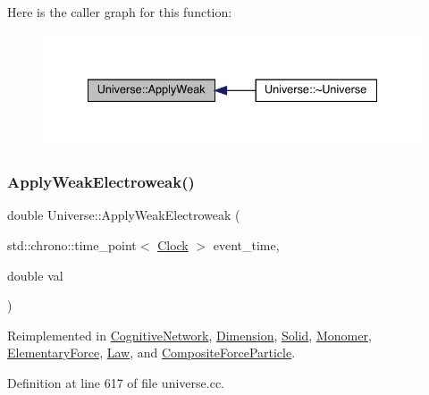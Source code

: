 Here is the caller graph for this function\+:
\nopagebreak
\begin{figure}[H]
\begin{center}
\leavevmode
\includegraphics[width=335pt]{class_universe_a6d1226b3adec3c42a833afdbb6a65a92_icgraph}
\end{center}
\end{figure}
\mbox{\label{class_universe_a46a906baabb63e5d31f8b48ea1fae52e}} 
\subsubsection{\texorpdfstring{Apply\+Weak\+Electroweak()}{ApplyWeakElectroweak()}}
{\footnotesize\ttfamily double Universe\+::\+Apply\+Weak\+Electroweak (\begin{DoxyParamCaption}\item[{std\+::chrono\+::time\+\_\+point$<$ \hyperlink{universe_8h_a0ef8d951d1ca5ab3cfaf7ab4c7a6fd80}{Clock} $>$}]{event\+\_\+time,  }\item[{double}]{val }\end{DoxyParamCaption})\hspace{0.3cm}{\ttfamily [virtual]}}



Reimplemented in \hyperlink{class_cognitive_network_ab8bc213d2806f0dc49c1284bf934fc24}{Cognitive\+Network}, \hyperlink{class_dimension_abf490cabd486afa660f17940ed0d17e6}{Dimension}, \hyperlink{class_solid_ad6c28ec896cbcf64e24a7132a144befd}{Solid}, \hyperlink{class_monomer_a64f65c128ebc2428c42739c930696ea1}{Monomer}, \hyperlink{class_elementary_force_a2d3a5444c771f35d66d4151c62f53b12}{Elementary\+Force}, \hyperlink{class_law_ae8a5d1d09686d79f7814c8800791460b}{Law}, and \hyperlink{class_composite_force_particle_a3c1c0b427c633f0685f1d812e02b92ff}{Composite\+Force\+Particle}.



Definition at line 617 of file universe.\+cc.

